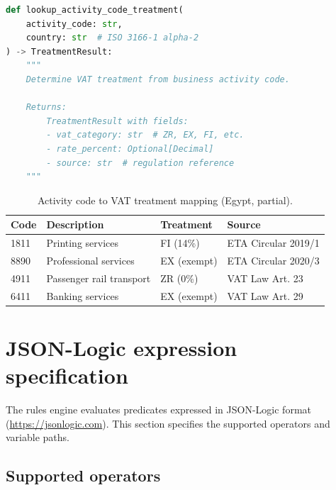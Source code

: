 \documentclass[11pt,a4paper,twoside]{report}
\begin{document}
\begin{lstlisting}[language=Python,basicstyle=\ttfamily\small,caption={Activity lookup API contract.}]
def lookup_activity_code_treatment(
    activity_code: str,
    country: str  # ISO 3166-1 alpha-2
) -> TreatmentResult:
    """
    Determine VAT treatment from business activity code.
    
    Returns:
        TreatmentResult with fields:
        - vat_category: str  # ZR, EX, FI, etc.
        - rate_percent: Optional[Decimal]
        - source: str  # regulation reference
    """
\end{lstlisting}

\begin{table}[htbp]
\centering
\caption{Activity code to VAT treatment mapping (Egypt, partial).}
\label{tab:activity-lookup}
\footnotesize
\begin{tabularx}{\linewidth}{@{}l l l X@{}}
\toprule
\textbf{Code} & \textbf{Description} & \textbf{Treatment} & \textbf{Source} \\ \midrule
1811 & Printing services & FI (14\%) & ETA Circular 2019/1 \\
8890 & Professional services & EX (exempt) & ETA Circular 2020/3 \\
4911 & Passenger rail transport & ZR (0\%) & VAT Law Art. 23 \\
6411 & Banking services & EX (exempt) & VAT Law Art. 29 \\
\bottomrule
\end{tabularx}
\end{table}

\section{JSON-Logic expression specification}

The rules engine evaluates predicates expressed in JSON-Logic format
(\url{https://jsonlogic.com}). This section specifies the supported
operators and variable paths.

\subsection{Supported operators}
\end{document}
